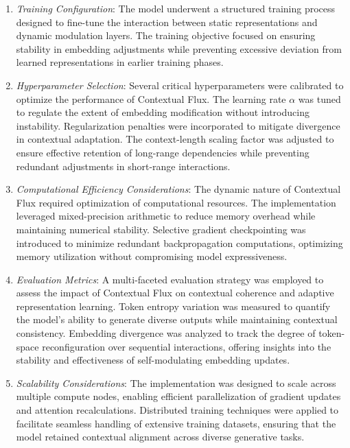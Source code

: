 \documentclass{article}
\begin{document}
\begin{enumerate}
	\item \textit{Training Configuration}: The model underwent a structured training process designed to fine-tune the interaction between static representations and dynamic modulation layers. The training objective focused on ensuring stability in embedding adjustments while preventing excessive deviation from learned representations in earlier training phases.
	
	\item \textit{Hyperparameter Selection}: Several critical hyperparameters were calibrated to optimize the performance of Contextual Flux. The learning rate $\alpha$ was tuned to regulate the extent of embedding modification without introducing instability. Regularization penalties were incorporated to mitigate divergence in contextual adaptation. The context-length scaling factor was adjusted to ensure effective retention of long-range dependencies while preventing redundant adjustments in short-range interactions.
	
	\item \textit{Computational Efficiency Considerations}: The dynamic nature of Contextual Flux required optimization of computational resources. The implementation leveraged mixed-precision arithmetic to reduce memory overhead while maintaining numerical stability. Selective gradient checkpointing was introduced to minimize redundant backpropagation computations, optimizing memory utilization without compromising model expressiveness.
	
	\item \textit{Evaluation Metrics}: A multi-faceted evaluation strategy was employed to assess the impact of Contextual Flux on contextual coherence and adaptive representation learning. Token entropy variation was measured to quantify the model's ability to generate diverse outputs while maintaining contextual consistency. Embedding divergence was analyzed to track the degree of token-space reconfiguration over sequential interactions, offering insights into the stability and effectiveness of self-modulating embedding updates.
	
	\item \textit{Scalability Considerations}: The implementation was designed to scale across multiple compute nodes, enabling efficient parallelization of gradient updates and attention recalculations. Distributed training techniques were applied to facilitate seamless handling of extensive training datasets, ensuring that the model retained contextual alignment across diverse generative tasks.
	

\end{enumerate}
\end{document}
